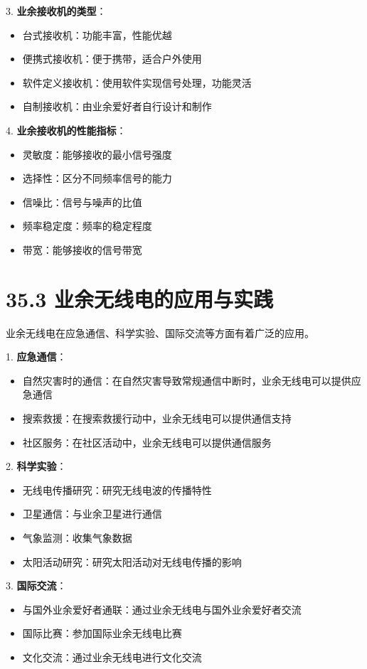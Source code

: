\documentclass[12pt,UTF8]{ctexbook}
\begin{document}
3. \textbf{业余接收机的类型}：
   \begin{itemize}[leftmargin=3.5em]
   \item 台式接收机：功能丰富，性能优越
   \item 便携式接收机：便于携带，适合户外使用
   \item 软件定义接收机：使用软件实现信号处理，功能灵活
   \item 自制接收机：由业余爱好者自行设计和制作
   \end{itemize}

4. \textbf{业余接收机的性能指标}：
   \begin{itemize}[leftmargin=3.5em]
   \item 灵敏度：能够接收的最小信号强度
   \item 选择性：区分不同频率信号的能力
   \item 信噪比：信号与噪声的比值
   \item 频率稳定度：频率的稳定程度
   \item 带宽：能够接收的信号带宽
   \end{itemize}

\section*{35.3 业余无线电的应用与实践}

业余无线电在应急通信、科学实验、国际交流等方面有着广泛的应用。

1. \textbf{应急通信}：
   \begin{itemize}[leftmargin=3.5em]
   \item 自然灾害时的通信：在自然灾害导致常规通信中断时，业余无线电可以提供应急通信
   \item 搜索救援：在搜索救援行动中，业余无线电可以提供通信支持
   \item 社区服务：在社区活动中，业余无线电可以提供通信服务
   \end{itemize}

2. \textbf{科学实验}：
   \begin{itemize}[leftmargin=3.5em]
   \item 无线电传播研究：研究无线电波的传播特性
   \item 卫星通信：与业余卫星进行通信
   \item 气象监测：收集气象数据
   \item 太阳活动研究：研究太阳活动对无线电传播的影响
   \end{itemize}

3. \textbf{国际交流}：
   \begin{itemize}[leftmargin=3.5em]
   \item 与国外业余爱好者通联：通过业余无线电与国外业余爱好者交流
   \item 国际比赛：参加国际业余无线电比赛
   \item 文化交流：通过业余无线电进行文化交流
   \end{itemize}
\end{document}
